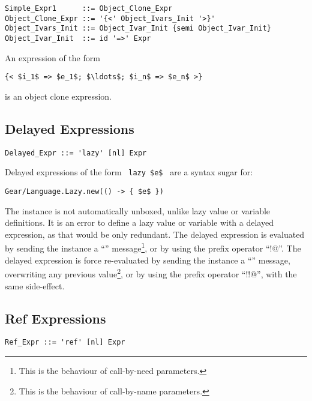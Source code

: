 \syntax\begin{lstlisting}
Simple_Expr1      ::= Object_Clone_Expr
Object_Clone_Expr ::= '{<' Object_Ivars_Init '>}'
Object_Ivars_Init ::= Object_Ivar_Init {semi Object_Ivar_Init}
Object_Ivar_Init  ::= id '=>' Expr
\end{lstlisting}

An expression of the form
\begin{lstlisting}
{< $i_1$ => $e_1$; $\ldots$; $i_n$ => $e_n$ >}
\end{lstlisting}
is an object clone expression. 





\subsection{Delayed Expressions}
\label{sec:delayed-expressions}

\syntax\begin{lstlisting}
Delayed_Expr ::= 'lazy' [nl] Expr
\end{lstlisting}

Delayed expressions of the form ~\lstinline!lazy $e$!~ are a syntax sugar for:
\begin{lstlisting}[deletekeywords={new}]
Gear/Language.Lazy.new(() -> { $e$ })
\end{lstlisting}

The  instance is not automatically unboxed, unlike lazy value or variable definitions. It is an error to define a lazy value or variable with a delayed expression, as that would be only redundant. The delayed expression is evaluated by sending the instance a ``'' message\footnote{This is the behaviour of call-by-need parameters.}, or by using the prefix operator ``\lstinline@!@''. The delayed expression is force re-evaluated by sending the instance a ``'' message, overwriting any previous value\footnote{This is the behaviour of call-by-name parameters.}, or by using the prefix operator ``\lstinline@!!@'', with the same side-effect. 






\subsection{Ref Expressions}
\label{sec:ref-expressions}

\syntax\begin{lstlisting}
Ref_Expr ::= 'ref' [nl] Expr
\end{lstlisting}


